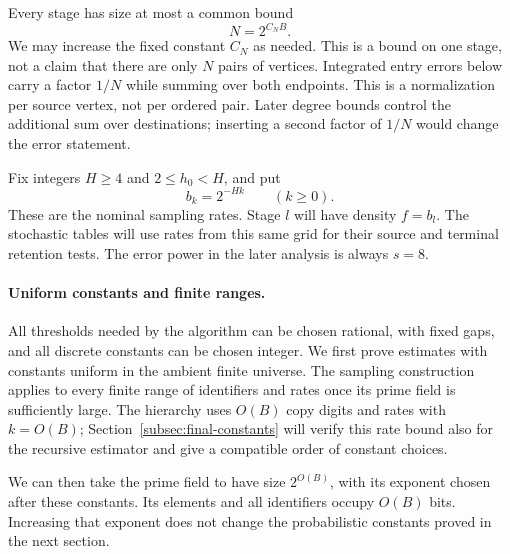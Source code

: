 Every stage has size at most a common bound
\[
N=2^{C_NB}.
\]
We may increase the fixed constant $C_N$ as needed. This is a bound on
one stage, not a claim that there are only $N$ pairs of vertices.
Integrated entry errors below carry a factor $1/N$ while summing over both endpoints. This is a normalization per source vertex, not per ordered pair. Later degree bounds control the additional sum over destinations; inserting a second factor of $1/N$ would change the error statement.

Fix integers $H\ge4$ and $2\le h_0<H$, and put
\[
b_k=2^{-Hk}\qquad(k\ge0).
\]
These are the nominal sampling rates. Stage $l$ will have density
$f=b_l$. The stochastic tables will use rates from this same grid
for their source and terminal retention tests. The error power in
the later analysis is always $s=8$.

\paragraph{Uniform constants and finite ranges.}
All thresholds needed by the algorithm can be chosen rational, with
fixed gaps, and all discrete constants can be chosen integer. We
first prove estimates with constants uniform in the ambient finite
universe. The sampling construction applies to every finite range of
identifiers and rates once its prime field is sufficiently large.
The hierarchy uses $O(B)$ copy digits and rates with $k=O(B)$;
Section~\ref{subsec:final-constants} will verify this rate bound also
for the recursive estimator and give a compatible order of constant
choices.

We can then take the prime field to have size $2^{O(B)}$, with its
exponent chosen after these constants. Its elements and all identifiers
occupy $O(B)$ bits. Increasing that exponent does not change the
probabilistic constants proved in the next section.

